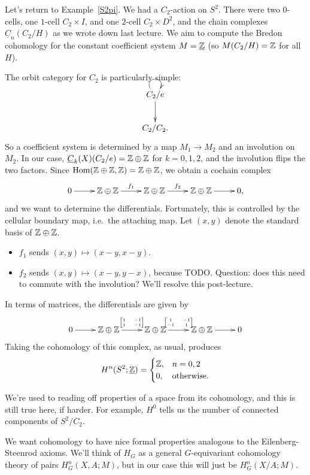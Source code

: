 \begin{exm}
Let's return to Example~\ref{S2pi}. We had a $C_2$-action on $S^2$. There were two $0$-cells, one $1$-cell
$C_2\times I$, and one $2$-cell $C_2\times D^2$, and the chain complexes $\underline C_n(C_2/H)$ as we wrote down
last lecture. We aim to compute the Bredon cohomology for the constant coefficient system $M = \underline{\mathbb Z}$ (so
$M(C_2/H) = \mathbb Z$ for all $H$).

The orbit category for $C_2$ is particularly simple:
\[\xymatrix{
	C_2/e\ar[d]\ar@(ul, ur)\\
	C_2/C_2.
}\]
So a coefficient system is determined by a map $M_1\to M_2$ and an involution on $M_2$. In our case, $\underline
C_k(X)(C_2/e) = \mathbb Z\oplus\mathbb Z$ for $k = 0,1,2$, and the involution flips the two factors. Since $\operatorname{Hom}(\mathbb Z\oplus\mathbb Z, \mathbb Z)
= \mathbb Z\oplus\mathbb Z$, we obtain a cochain complex
\[\shortexact[f_1][f_2]{\Z\oplus\Z}{\Z\oplus\Z}{\Z\oplus\Z},\]
and we want to determine the differentials. Fortunately, this is controlled by the cellular boundary map, i.e.\ the
attaching map. Let $(x,y)$ denote the standard basis of $\mathbb Z\oplus\mathbb Z$.
\begin{itemize}
	\item $f_1$ sends $(x,y)\mapsto (x-y, x-y)$.
	\item $f_2$ sends $(x,y)\mapsto (x-y, y-x)$, because {\color{red}TODO}. Question: does this need to commute
	with the involution? We'll resolve this post-lecture.
\end{itemize}
In terms of matrices, the differentials are given by
\[\xymatrix{
	0 \ar[r] & \Z\oplus\Z \ar[r]^-{\text{\tiny$\matr 1{-1}1{-1}$}} & \Z\oplus\Z \ar[r]^-{\text{\tiny$\matr 1{-1}{-1}1$}} & \Z\oplus\Z \ar[r] & 0
}\]
Taking the cohomology of this complex, as usual, produces
\[H^n(S^2;\underline{\mathbb Z}) = \begin{cases}
	\mathbb Z, & n = 0, 2\\
	0, &\text{otherwise.}
\end{cases}\]
\end{exm}
\begin{rem}
We're used to reading off properties of a space from its cohomology, and this is still true here, if harder. For
example, $H^0$ tells us the number of connected components of $S^2/C_2$.
\end{rem}
We want cohomology to have nice formal properties analogous to the Eilenberg-Steenrod axioms. We'll think of $H_G$
as a general $G$-equivariant cohomology theory of pairs $H_G^n(X, A; M)$, but in our case this will just be
$H_G^n(X/A; M)$.
